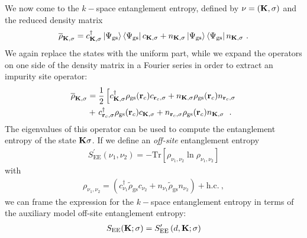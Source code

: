 \documentclass[reprint,hidelinks]{revtex4-2}
\begin{document}
We now come to the \(k-\)space entanglement entropy, defined by \(\nu = ({\bf K},\sigma)\) and the reduced density matrix
\begin{equation}\begin{aligned}
	\overline\rho_{{\bf K},\sigma} = c^\dagger_{{\bf K},\sigma} \ket{\Psi_\text{gs}}\bra{\Psi_\text{gs}} c_{{\bf K},\sigma} + n_{{\bf K},\sigma} \ket{\Psi_\text{gs}}\bra{\Psi_\text{gs}} n_{{\bf K},\sigma}~.
\end{aligned}\end{equation}
We again replace the states with the uniform part, while we expand the operators on one side of the density matrix in a Fourier series in order to extract an impurity site operator:
\begin{equation}\begin{aligned}
	\overline\rho_{{\bf K},\sigma} &= \frac{1}{2}\left[c^\dagger_{{\bf K},\sigma} \rho_\text{gs}({\bf r}_c) c_{{\bf r}_c,\sigma} + n_{{\bf K},\sigma} \rho_\text{gs}({\bf r}_c) n_{{\bf r}_c,\sigma} \right.\\
	&+ \left. c^\dagger_{{\bf r}_c,\sigma} \rho_\text{gs}({\bf r}_c) c_{{\bf K},\sigma} + n_{{\bf r}_c,\sigma} \rho_\text{gs}({\bf r}_c) n_{{\bf K},\sigma}\right. ~.
\end{aligned}\end{equation}
The eigenvalues of this operator can be used to compute the entanglement entropy of the state \({\bf K}\sigma\). If we define an {\it off-site} entanglement entropy 
\begin{equation}\begin{aligned}
	S^\prime_{\text{EE}}(\nu_1,\nu_2) = -\text{Tr}\left[\rho_{\nu_1,\nu_2}\ln \rho_{\nu_1,\nu_2}\right]
\end{aligned}\end{equation}
with 
\begin{equation}\begin{aligned}
	\rho_{\nu_1,\nu_2} = (c^\dagger_{\nu_1} \tilde\rho_\text{gs} c_{\nu_2} + n_{\nu_1} \tilde\rho_\text{gs} n_{\nu_2}) + \text{h.c.}~,
\end{aligned}\end{equation}
we can frame the expression for the \(k-\)space entanglement entropy in terms of the auxiliary model off-site entanglement entropy:
\begin{equation}\begin{aligned}
	S_\text{EE}({\bf K};\sigma) = S^\prime_\text{EE}\left(d, {\bf K};\sigma\right) 
\end{aligned}\end{equation}
\end{document}
